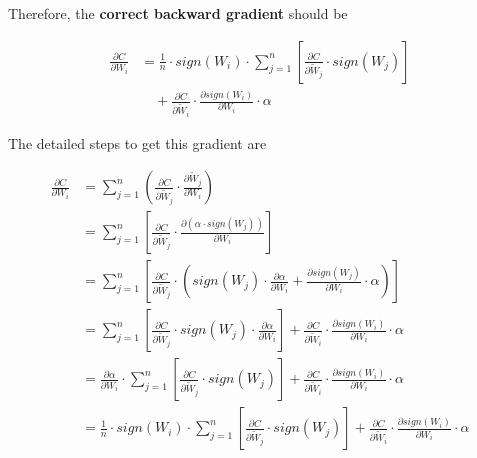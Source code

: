 \documentclass[12pt]{article} %
\begin{document}
Therefore, the \textbf{correct backward gradient} should be

\begin{equation}
\begin{aligned}
	\frac{\partial C}{\partial W_{i}} &= 
	\frac{1}{n} \cdot sign(W_{i}) \cdot 
	\sum_{j=1}^{n}[\frac{\partial C}{\partial \widetilde{W}_j} \cdot sign(W_j)]\\
	&\quad +
	\frac{\partial C}{\partial \widetilde{W}_i} \cdot
	\frac{\partial sign(W_i)}{\partial W_i} \cdot \alpha
\end{aligned}
\end{equation}

The detailed steps to get this gradient are

\begin{equation}
\begin{aligned}
	\frac{\partial C}{\partial W_{i}}
	&= 
	\sum_{j=1}^{n} (\frac{\partial C}{\partial \widetilde{W}_j}\cdot
	\frac{\partial \widetilde{W}_j}{\partial W_i}) 
	\\ &=
	\sum_{j=1}^{n} [\frac{\partial C}{\partial \widetilde{W}_j}\cdot
	\frac{\partial (\alpha \cdot sign(W_j))}{\partial W_i}] 
	\\ &=
	\sum_{j=1}^{n} [\frac{\partial C}{\partial \widetilde{W}_j}\cdot
	(sign(W_j)\cdot\frac{\partial \alpha}{\partial W_i} + 
	\frac{\partial sign(W_j)}{\partial W_i}\cdot\alpha)]
	\\ &=
	\sum_{j=1}^{n} [\frac{\partial C}{\partial \widetilde{W}_j}\cdot
	sign(W_j)\cdot\frac{\partial \alpha}{\partial W_i}] + 
	\frac{\partial C}{\partial \widetilde{W}_i} \cdot
	\frac{\partial sign(W_i)}{\partial W_i}\cdot\alpha
	\\ &=
	\frac{\partial \alpha}{\partial W_i}\cdot
	\sum_{j=1}^{n} [\frac{\partial C}{\partial \widetilde{W}_j}\cdot
	sign(W_j)] + 
	\frac{\partial C}{\partial \widetilde{W}_i} \cdot
	\frac{\partial sign(W_i)}{\partial W_i}\cdot\alpha
	\\ &=
	\frac{1}{n}\cdot sign(W_i) \cdot
	\sum_{j=1}^{n} [\frac{\partial C}{\partial \widetilde{W}_j}\cdot
	sign(W_j)] + 
	\frac{\partial C}{\partial \widetilde{W}_i} \cdot
	\frac{\partial sign(W_i)}{\partial W_i}\cdot\alpha
\end{aligned}
\end{equation}
\end{document}
